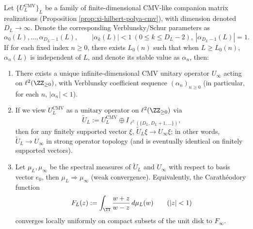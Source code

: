 \begin{theorem}[Pointwise Stabilization of Finite CMV Certificates \texorpdfstring{$\Rightarrow$}{=>} Infinite-Dimensional CMV Spectral Realization]\label{thm:xi-cmv-stabilization-infinite}
Let \(\{U_L^{\mathrm{CMV}}\}_{L}\) be a family of finite-dimensional CMV-like companion matrix realizations (Proposition \ref{prop:xi-hilbert-polya-cmv}), with dimension denoted \(D_L\to\infty\).
Denote the corresponding Verblunsky/Schur parameters as
\[
\alpha_0(L),\dots,\alpha_{D_L-1}(L),
\qquad
|\alpha_k(L)|<1\ (0\le k\le D_L-2),\ |\alpha_{D_L-1}(L)|=1.
\]
If for each fixed index \(n\ge 0\), there exists \(L_0(n)\) such that when \(L\ge L_0(n)\), \(\alpha_n(L)\) is independent of \(L\), and denote its stable value as \(\alpha_n\), then:
\begin{enumerate}
  \item There exists a unique infinite-dimensional CMV unitary operator \(U_\infty\) acting on \(\ell^2(\ZZ_{\ge 0})\), with Verblunsky coefficient sequence \((\alpha_n)_{n\ge 0}\) (in particular, for each \(n\), \(|\alpha_n|<1\)).
  \item If we view \(U_L^{\mathrm{CMV}}\) as a unitary operator on \(\ell^2(\ZZ_{\ge 0})\) via
  \[
  \widetilde U_L:=U_L^{\mathrm{CMV}}\oplus I_{\ell^2(\{D_L,D_L+1,\dots\})},
  \]
  then for any finitely supported vector \(\xi\), \(\widetilde U_L\xi\to U_\infty\xi\); in other words, \(\widetilde U_L\to U_\infty\) in strong operator topology (and is eventually identical on finitely supported vectors).
  \item Let \(\mu_L,\mu_\infty\) be the spectral measures of \(\widetilde U_L\) and \(U_\infty\) with respect to basis vector \(e_0\), then \(\mu_L\Rightarrow \mu_\infty\) (weak convergence).
  Equivalently, the Carath\'eodory function
  \[
  F_L(z):=\int_{\TT}\frac{w+z}{w-z}\,d\mu_L(w)\qquad(|z|<1)
  \]
  converges locally uniformly on compact subsets of the unit disk to \(F_\infty\).
\end{enumerate}
\end{theorem}

